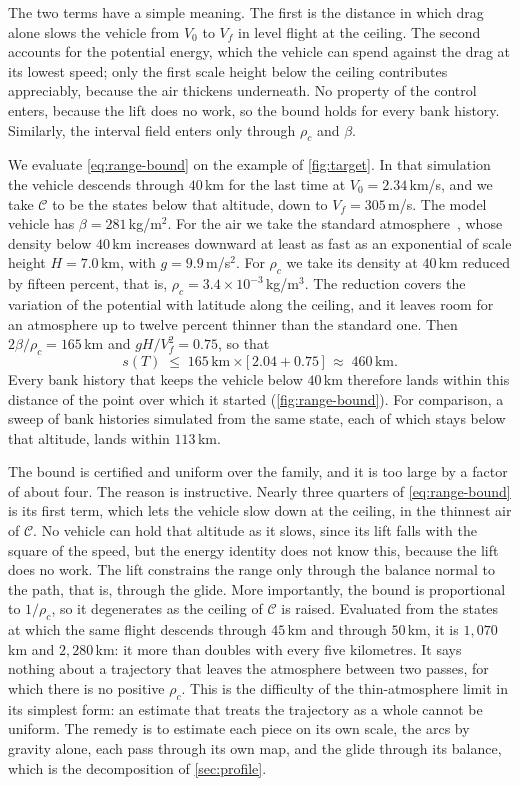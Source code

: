 \documentclass[english,11pt]{extarticle}
\begin{document}
The two terms have a simple meaning. The first is the distance in which
drag alone slows the vehicle from $V_0$ to $V_f$ in level flight at the
ceiling. The second accounts for the potential energy, which the vehicle
can spend against the drag at its lowest speed; only the first scale height
below the ceiling contributes appreciably, because the air thickens
underneath. No property of the control enters, because the lift does no
work, so the bound holds for every bank history. Similarly, the interval
field enters only through $\rho_c$ and $\beta$.

We evaluate \cref{eq:range-bound} on the example of \cref{fig:target}. In
that simulation the vehicle descends through $40$\,km for the last time at
$V_0 = 2.34$\,km/s, and we take $\mathcal{C}$ to be the states below that
altitude, down to $V_f = 305$\,m/s. The model vehicle has
$\beta = 281$\,kg/m$^2$. For the air we take the standard
atmosphere~\cite{noaa1976standard}, whose density below $40$\,km increases
downward at least as fast as an exponential of scale height $H = 7.0$\,km,
with $g = 9.9$\,m/s$^2$. For $\rho_c$ we take its density at $40$\,km
reduced by fifteen percent, that is,
$\rho_c = 3.4\times 10^{-3}$\,kg/m$^3$. The reduction covers the variation
of the potential with latitude along the ceiling, and it leaves room for an
atmosphere up to twelve percent thinner than the standard one. Then
$2\beta/\rho_c = 165$\,km and $gH/V_f^2 = 0.75$, so that
\[
  s(T) \;\le\; 165\,\text{km}\times\bigl[\,2.04 + 0.75\,\bigr]
  \;\approx\; 460\,\text{km}.
\]
Every bank history that keeps the vehicle below $40$\,km therefore lands
within this distance of the point over which it started
(\cref{fig:range-bound}). For comparison, a sweep of bank histories
simulated from the same state, each of which stays below that altitude,
lands within $113$\,km.

The bound is certified and uniform over the family, and it is too large by
a factor of about four. The reason is instructive. Nearly three quarters of
\cref{eq:range-bound} is its first term, which lets the vehicle slow down
at the ceiling, in the thinnest air of $\mathcal{C}$. No vehicle can hold
that altitude as it slows, since its lift falls with the square of the
speed, but the energy identity does not know this, because the lift does no
work. The lift constrains the range only through the balance normal to the
path, that is, through the glide. More importantly, the bound is
proportional to $1/\rho_c$, so it degenerates as the ceiling of
$\mathcal{C}$ is raised. Evaluated from the states at which the same flight
descends through $45$\,km and through $50$\,km, it is $1{,}070$\,km and
$2{,}280$\,km: it more than doubles with every five kilometres. It says
nothing about a trajectory that leaves the atmosphere between two passes,
for which there is no positive $\rho_c$. This is the difficulty of the
thin-atmosphere
limit in its simplest form: an estimate that treats the trajectory as a
whole cannot be uniform. The remedy is to estimate each piece on its own
scale, the arcs by gravity alone, each pass through its own map, and the
glide through its balance, which is the decomposition of \cref{sec:profile}.
\end{document}
